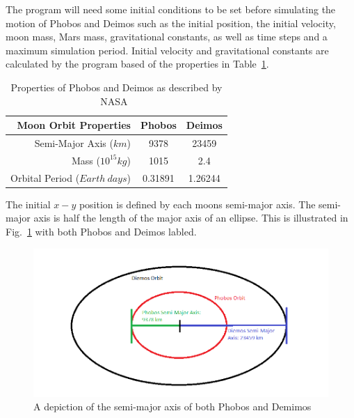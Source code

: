 \documentclass[11pt]{article}
\begin{document}
\vspace{\baselineskip} \noindent
The program will need some initial conditions to be set before simulating
the motion of Phobos and Deimos such as the initial position, the initial
velocity, moon mass, Mars mass, gravitational constants, as well as time steps and a maximum 
simulation period. Initial velocity and gravitational constants are calculated
by the program based of the properties in Table~\ref{table:moon-properties}.

\begin{table}[ht]
  \centering
  \begin{tabular}{|r|c|c|}
  \hline
  Moon Orbit Properties                & Phobos  & Deimos  \\ \hline
  Semi-Major Axis ($km$)                 & 9378    & 23459   \\ \hline
  Mass ($10^{15} kg$) & 1015    & 2.4     \\ \hline
  Orbital Period ($Earth\ days$)          & 0.31891 & 1.26244 \\ \hline
  \end{tabular}
  \label{table:moon-properties}
  \caption{Properties of Phobos and Deimos as described by NASA~\cite{nasa}}
  \end{table}

\noindent
The initial $x-y$ position is defined by each moons semi-major axis. 
The semi-major axis is half the length of the major axis of an ellipse.
This is illustrated in Fig.~\ref{fig:semi-major-axis} with both 
Phobos and Deimos labled.

\begin{figure}[ht]
  \centering
  \includegraphics[width=1.0\textwidth, angle =0]{../images/semi-major-axis}
  \caption{A depiction of the semi-major axis of both Phobos and Demimos}
  \label{fig:semi-major-axis}
\end{figure}
\end{document}
